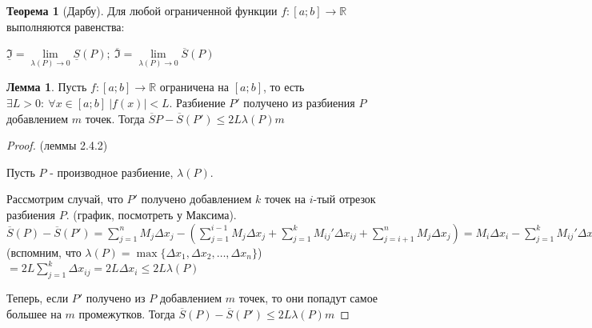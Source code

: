\documentclass{report}
\theoremstyle{definition}
\newtheorem{lemma}{Лемма}[section]
\newtheorem{theorem}{Теорема}[section]
\begin{document}
\begin{theorem}[Дарбу]
  Для любой ограниченной функции $f:[a;b]\rightarrow\mathbb{R}$ выполняются равенства:

  \begin{center}
    {\large $\underline{\mathfrak{I}} = \underset{\lambda(P)\rightarrow0}{\lim}\underline{S}(P); \ \overline{\mathfrak{I}}
        = \underset{\lambda(P)\rightarrow0}{\lim}\overline{S}(P)$}
  \end{center}
\end{theorem}

\begin{lemma}
  Пусть $f:[a;b]\rightarrow\mathbb{R}$ ограничена на $[a;b]$, то есть $\exists L > 0: \ \forall x \in [a;b]
    \ | f(x) | < L$. Разбиение $P'$ получено из разбиения $P$ добавлением $m$ точек. Тогда $\overline{S}{P}
    - \overline{S}(P') \leqslant 2L\lambda(P)m$
\end{lemma}

\begin{proof}
  (леммы 2.4.2)

  Пусть $P$ - производное разбиение, $\lambda(P)$.

  Рассмотрим случай, что $P'$ получено добавлением $k$ точек на $i$-тый отрезок разбиения $P$. (график,
  посмотреть у Максима). $\overline{S}(P) - \overline{S}(P') = \sum_{j=1}^{n}M_{j}\Delta x_{j} -
    (\sum_{j=1}^{i-1}M_{j}\Delta x_{j} + \sum_{j = 1}^{k}M_{ij}'\Delta x_{ij} + \sum_{j=i+1}^{n}
    M_{j}\Delta x_{j}) = M_{i}\Delta x_{i} - \sum_{j = 1}^{k}M_{ij}'\Delta x_{ij} = M_{i}\sum_{j=1}^{k}
    \Delta x_{ij} - \sum_{j=1}^{k}M_{ij}'\Delta x_{ij} = \sum_{j=1}^{k}M_{i}\Delta x_{ij} - \sum_{j=1}^{k}
    M_{ij}'\Delta x_{ij} = \sum_{j=1}^{k}(M_{i} - M_{ij}')\Delta x_{ij} \leqslant \sum_{j=1}^{k}2L\Delta x_{ij}
    =$ (вспомним, что $\lambda(P)=\max\{\Delta x_{1},\Delta x_{2},\ldots,\Delta x_{n}\}$) $=2L\sum_{j=1}^{k}
    \Delta x_{ij} = 2L\Delta x_{i} \leqslant 2L\lambda(P)$

  Теперь, если $P'$ получено из $P$ добавлением $m$ точек, то они попадут самое большее на $m$ промежутков.
  Тогда $\overline{S}(P) - \overline{S}(P') \leqslant 2L\lambda (P)m$
\end{proof}
\end{document}

